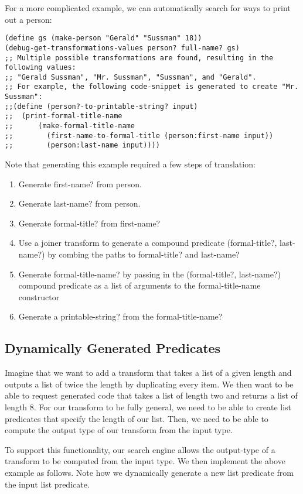 \documentclass[letterpaper]{article}
\begin{document}
For a more complicated example, we can automatically search for ways to print out a person:

\begin{verbatim}
(define gs (make-person "Gerald" "Sussman" 18))
(debug-get-transformations-values person? full-name? gs)
;; Multiple possible transformations are found, resulting in the following values:
;; "Gerald Sussman", "Mr. Sussman", "Sussman", and "Gerald".
;; For example, the following code-snippet is generated to create "Mr. Sussman": 
;;(define (person?-to-printable-string? input)
;;  (print-formal-title-name 
;;      (make-formal-title-name 
;;        (first-name-to-formal-title (person:first-name input)) 
;;        (person:last-name input))))

\end{verbatim}

Note that generating this example required a few steps of translation:
\begin{enumerate}
  \item Generate first-name? from person.
  \item Generate last-name? from person.
  \item Generate formal-title? from first-name?
  \item Use a joiner transform to generate a compound predicate (formal-title?, last-name?) by combing the paths to formal-title? and last-name?
  \item Generate formal-title-name? by passing in the (formal-title?, last-name?) compound predicate as a list of arguments to the formal-title-name constructor
  \item Generate a printable-string? from the formal-title-name?
\end{enumerate}

\subsection{Dynamically Generated Predicates}

Imagine that we want to add a transform that takes a list of a given length and outputs a list of twice the length by duplicating every item. We then want to be able to request generated code that takes a list of length two and returns a list of length 8. For our transform to be fully general, we need to be able to create list predicates that specify the length of our list. Then, we need to be able to compute the output type of our transform from the input type. 

To support this functionality, our search engine allows the output-type of a transform to be computed from the input type. We then implement the above example as follows. Note how we dynamically generate a new list predicate from the input list predicate.
\end{document}
